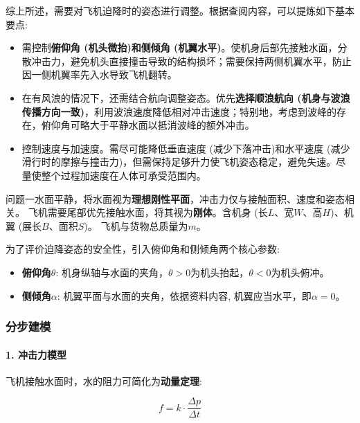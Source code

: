 \documentclass{cumcmthesis}
\begin{document}
综上所述，需要对飞机迫降时的姿态进行调整。根据查阅内容，可以提炼如下基本要点:

\begin{itemize}
    
    \item 需控制\textbf{俯仰角 (机头微抬)和侧倾角 (机翼水平)}。使机身后部先接触水面，分散冲击力，避免机头直接撞击导致的结构损坏；需要保持两侧机翼水平，防止因一侧机翼率先入水导致飞机翻转。
    
    \item 在有风浪的情况下，还需结合航向调整姿态。优先\textbf{选择顺浪航向 (机身与波浪传播方向一致)}，利用波浪速度降低相对冲击速度；特别地，考虑到波峰的存在，俯仰角可略大于平静水面以抵消波峰的额外冲击。

    \item 控制速度与加速度。需尽可能降低垂直速度 (减少下落冲击)和水平速度 (减少滑行时的摩擦与撞击力)，但需保持足够升力使飞机姿态稳定，避免失速。尽量使整个过程加速度在人体可承受范围内。

\end{itemize}

问题一水面平静，将水面视为\textbf{理想刚性平面}，冲击力仅与接触面积、速度和姿态相关。
飞机需要尾部优先接触水面，将其视为\textbf{刚体}。含机身 (长$L$、宽$W$、高$H$)、机翼 (展长$B$、面积$S$)。
飞机与货物总质量为$m$。

为了评价迫降姿态的安全性，引入俯仰角和侧倾角两个核心参数:

\begin{itemize}

    \item \textbf{俯仰角$\theta$}: 机身纵轴与水面的夹角，$\theta>0$为机头抬起，$\theta<0$为机头俯冲。

    \item \textbf{侧倾角$\alpha$}: 机翼平面与水面的夹角，依据资料内容, 机翼应当水平，即$\alpha=0$。
    
\end{itemize}
    

\subsubsection{分步建模}


 \paragraph{1. 冲击力模型}
    飞机接触水面时，水的阻力可简化为\textbf{动量定理}:
    
    \begin{equation}
     f = k \cdot \frac{\Delta p}{\Delta t} 
    \label{FormulaOfF}
    \end{equation}
\end{document}
